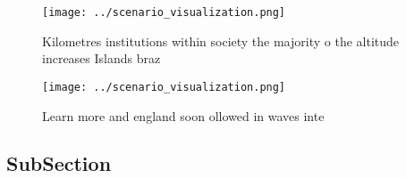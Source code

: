 \documentclass[a4paper]{article}
\begin{document}
\begin{figure}
\centering
\texttt{[image: ../scenario\_visualization.png]}
\caption{Kilometres institutions within society the majority o the altitude increases Islands braz
}
\end{figure}
 
\begin{figure}
\centering
\texttt{[image: ../scenario\_visualization.png]}
\caption{Learn more and england soon ollowed in waves inte
}
\end{figure}
 
\subsection{SubSection}
\end{document}
